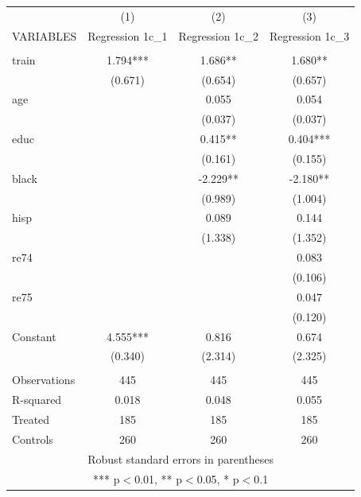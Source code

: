 \documentclass[]{article}
\begin{document}
\begin{tabular}{lccc} \hline
 & (1) & (2) & (3) \\
VARIABLES & Regression 1c\_1 & Regression 1c\_2 & Regression 1c\_3 \\ \hline
 &  &  &  \\
train & 1.794*** & 1.686** & 1.680** \\
 & (0.671) & (0.654) & (0.657) \\
age &  & 0.055 & 0.054 \\
 &  & (0.037) & (0.037) \\
educ &  & 0.415** & 0.404*** \\
 &  & (0.161) & (0.155) \\
black &  & -2.229** & -2.180** \\
 &  & (0.989) & (1.004) \\
hisp &  & 0.089 & 0.144 \\
 &  & (1.338) & (1.352) \\
re74 &  &  & 0.083 \\
 &  &  & (0.106) \\
re75 &  &  & 0.047 \\
 &  &  & (0.120) \\
Constant & 4.555*** & 0.816 & 0.674 \\
 & (0.340) & (2.314) & (2.325) \\
 &  &  &  \\
Observations & 445 & 445 & 445 \\
R-squared & 0.018 & 0.048 & 0.055 \\
Treated & 185 & 185 & 185 \\
 Controls & 260 & 260 & 260 \\ \hline
\multicolumn{4}{c}{ Robust standard errors in parentheses} \\
\multicolumn{4}{c}{ *** p$<$0.01, ** p$<$0.05, * p$<$0.1} \\
\end{tabular}
\end{document}
